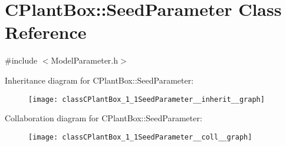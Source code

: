 \hypertarget{classCPlantBox_1_1SeedParameter}{}\section{C\+Plant\+Box\+:\+:Seed\+Parameter Class Reference}
\label{classCPlantBox_1_1SeedParameter}


{\ttfamily \#include $<$Model\+Parameter.\+h$>$}



Inheritance diagram for C\+Plant\+Box\+:\+:Seed\+Parameter\+:\nopagebreak
\begin{figure}[H]
\begin{center}
\leavevmode
\texttt{[image: classCPlantBox\_1\_1SeedParameter\_\_inherit\_\_graph]}
\end{center}
\end{figure}


Collaboration diagram for C\+Plant\+Box\+:\+:Seed\+Parameter\+:\nopagebreak
\begin{figure}[H]
\begin{center}
\leavevmode
\texttt{[image: classCPlantBox\_1\_1SeedParameter\_\_coll\_\_graph]}
\end{center}
\end{figure}
